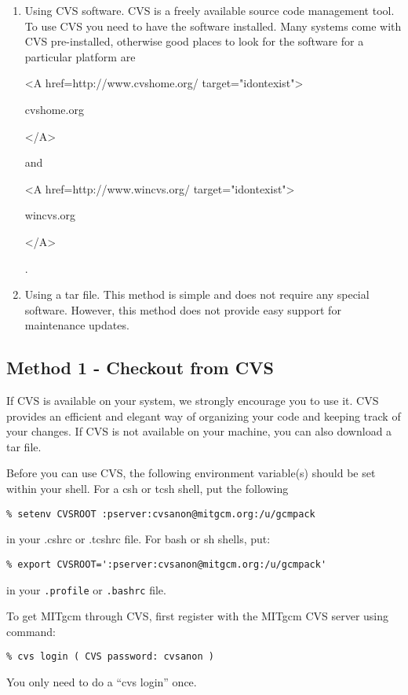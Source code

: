 \begin{enumerate}
\item Using CVS software. CVS is a freely available source code management
tool. To use CVS you need to have the software installed. Many systems
come with CVS pre-installed, otherwise good places to look for
the software for a particular platform are
\begin{rawhtml} <A href=http://www.cvshome.org/ target="idontexist"> \end{rawhtml}
cvshome.org
\begin{rawhtml} </A> \end{rawhtml}
and
\begin{rawhtml} <A href=http://www.wincvs.org/ target="idontexist"> \end{rawhtml}
wincvs.org
\begin{rawhtml} </A> \end{rawhtml}
.

\item Using a tar file. This method is simple and does not
require any special software. However, this method does not
provide easy support for maintenance updates.

\end{enumerate}

\subsection{Method 1 - Checkout from CVS}
\label{sect:cvs_checkout}

If CVS is available on your system, we strongly encourage you to use it. CVS
provides an efficient and elegant way of organizing your code and keeping
track of your changes. If CVS is not available on your machine, you can also
download a tar file.

Before you can use CVS, the following environment variable(s) should
be set within your shell.  For a csh or tcsh shell, put the following 
\begin{verbatim}
% setenv CVSROOT :pserver:cvsanon@mitgcm.org:/u/gcmpack
\end{verbatim}
in your .cshrc or .tcshrc file.  For bash or sh shells, put:
\begin{verbatim}
% export CVSROOT=':pserver:cvsanon@mitgcm.org:/u/gcmpack'
\end{verbatim}
in your \texttt{.profile} or \texttt{.bashrc} file.


To get MITgcm through CVS, first register with the MITgcm CVS server
using command:
\begin{verbatim}
% cvs login ( CVS password: cvsanon )
\end{verbatim}
You only need to do a ``cvs login'' once.

